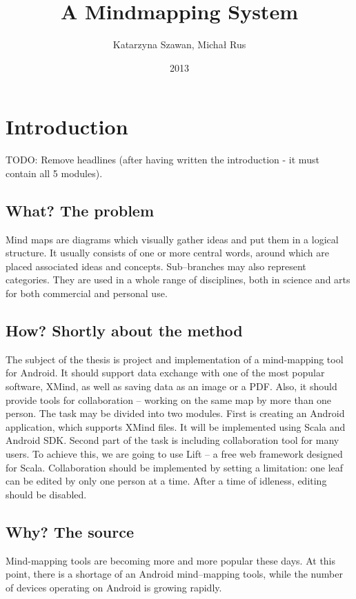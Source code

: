 \documentclass[american]{bsc}
\title{A Mindmapping System}
\author{Katarzyna Szawan, Michał Rus}
\date{2013}
\begin{document}
\maketitle 

\chapter{Introduction}
\label{chap:introduction}
TODO: Remove headlines (after having written the introduction - it must contain all 5 modules). 
\section{What? The problem}
\label{sec:what}
Mind maps are diagrams which visually gather ideas and put them in a logical structure. It usually consists of one or more central words, around which are placed associated ideas and concepts. Sub--branches may also represent categories.  They are used in a whole range of disciplines, both in science and arts for both commercial and personal use. 

\section{How? Shortly about the method}
\label{sec:how}
The subject of the thesis is project and implementation of a mind-mapping tool for Android. It should support data exchange with one of the most popular software, XMind, as well as saving data as an image or a PDF. Also, it should provide tools for collaboration -- working on the same map by more than one person. The task may be divided into two modules. First is creating an Android application, which supports XMind files. It will be implemented using Scala and Android SDK. Second part of the task is including collaboration tool for many users. To achieve this, we are going to use Lift -- a free web framework  designed for Scala. Collaboration should be implemented by setting a limitation: one leaf can be edited by only one person at a time. After a time of idleness, editing should be disabled.

\section{Why? The source}
\label{sec:why}
Mind-mapping tools are becoming more and more popular these days. At this point, there is a shortage of an Android mind--mapping tools, while the number of devices operating on Android is growing rapidly. 
\end{document}
